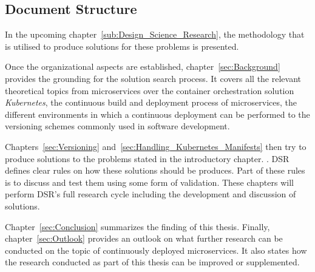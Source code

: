 
\subsection{Document Structure}%
\label{sub:Document Structure}

In the upcoming chapter~\ref{sub:Design_Science_Research}, the methodology that
is utilised to produce solutions for these problems is presented.

Once the organizational aspects are established, chapter~\ref{sec:Background}
provides the grounding for the solution search process. It covers all the
relevant theoretical topics from microservices over the container orchestration
solution \textit{Kubernetes}, the continuous build and deployment process of
microservices, the different environments in which a continuous deployment can
be performed to the versioning schemes commonly used in software development.

Chapters~\ref{sec:Versioning} and~\ref{sec:Handling_Kubernetes_Manifests} then
try to produce solutions to the problems stated in the introductory chapter.
. \acf{DSR} defines
clear rules on how these solutions should be produces. Part of these rules is
to discuss and test them using some form of validation. These chapters will
perform \acs{DSR}'s full research cycle including the development and
discussion of solutions.

Chapter~\ref{sec:Conclusion} summarizes the finding of this thesis. Finally,
chapter~\ref{sec:Outlook} provides an outlook on what further research can be
conducted on the topic of continuously deployed microservices. It also states
how the research conducted as part of this thesis can be improved or
supplemented.
